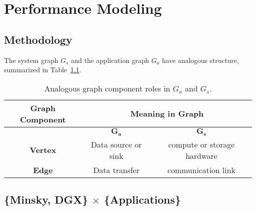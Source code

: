 \chapter{Performance Modeling}
\label{ch:performance}

\section{Methodology}

The system graph $G_s$ and the application graph $G_a$ have analogous structure, summarized in Table~\ref{tab:graph-comparison}.

\begin{table}[h]
    \centering
    \caption{Analogous graph component roles in $G_a$ and $G_s$.}
    \label{tab:graph-comparison}
    \begin{tabular}{|c|c|c|}
    \hline
    \textbf{Graph Component} & \multicolumn{2}{|c|}{\textbf{Meaning in Graph}}   \\ \hline
                             & $\bm{G_a}$    & $\bm{G_s}$                        \\ \hline \hline
    \textbf{Vertex}          & Data source or sink & compute or storage hardware \\ \hline
    \textbf{Edge}            & Data transfer & communication link                \\ \hline
    \end{tabular}
\end{table}



\section{\{Minsky, DGX\} $\times$ \{Applications\}}